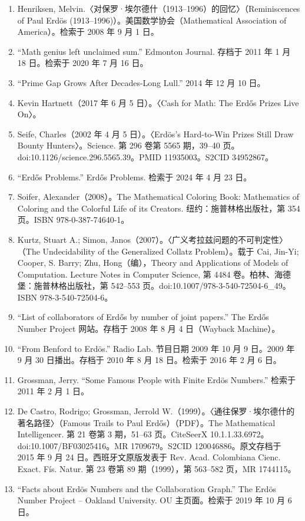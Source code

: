 \begin{enumerate}
\item Henriksen, Melvin.〈对保罗·埃尔德什（1913–1996）的回忆〉（Reminiscences of Paul Erdös (1913–1996)）。美国数学协会（Mathematical Association of America）。检索于 2008 年 9 月 1 日。
\item “Math genius left unclaimed sum.” Edmonton Journal. 存档于 2011 年 1 月 18 日。检索于 2020 年 7 月 16 日。
\item “Prime Gap Grows After Decades-Long Lull.” 2014 年 12 月 10 日。
\item Kevin Hartnett（2017 年 6 月 5 日）。〈Cash for Math: The Erdős Prizes Live On〉。
\item Seife, Charles（2002 年 4 月 5 日）。〈Erdös’s Hard-to-Win Prizes Still Draw Bounty Hunters〉。Science. 第 296 卷第 5565 期，39–40 页。doi:10.1126/science.296.5565.39。PMID 11935003。S2CID 34952867。
\item “Erdős Problems.” Erdős Problems. 检索于 2024 年 4 月 23 日。
\item Soifer, Alexander（2008）。The Mathematical Coloring Book: Mathematics of Coloring and the Colorful Life of its Creators. 纽约：施普林格出版社，第 354 页。ISBN 978-0-387-74640-1。
\item Kurtz, Stuart A.; Simon, Janos（2007）。〈广义考拉兹问题的不可判定性〉（The Undecidability of the Generalized Collatz Problem）。载于 Cai, Jin-Yi; Cooper, S. Barry; Zhu, Hong（编），Theory and Applications of Models of Computation. Lecture Notes in Computer Science, 第 4484 卷。柏林、海德堡：施普林格出版社，第 542–553 页。doi:10.1007/978-3-540-72504-6_49。ISBN 978-3-540-72504-6。
\item “List of collaborators of Erdős by number of joint papers.” The Erdős Number Project 网站。存档于 2008 年 8 月 4 日（Wayback Machine）。
\item “From Benford to Erdös.” Radio Lab. 节目日期 2009 年 10 月 9 日。2009 年 9 月 30 日播出。存档于 2010 年 8 月 18 日。检索于 2016 年 2 月 6 日。
\item Grossman, Jerry. “Some Famous People with Finite Erdös Numbers.” 检索于 2011 年 2 月 1 日。
\item De Castro, Rodrigo; Grossman, Jerrold W.（1999）。〈通往保罗·埃尔德什的著名路径〉（Famous Trails to Paul Erdős）（PDF）。The Mathematical Intelligencer. 第 21 卷第 3 期，51–63 页。CiteSeerX 10.1.1.33.6972。doi:10.1007/BF03025416。MR 1709679。S2CID 120046886。原文存档于 2015 年 9 月 24 日。西班牙文原版发表于 Rev. Acad. Colombiana Cienc. Exact. Fís. Natur. 第 23 卷第 89 期（1999），第 563–582 页，MR 1744115。
\item “Facts about Erdös Numbers and the Collaboration Graph.” The Erdös Number Project – Oakland University. OU 主页面。检索于 2019 年 10 月 6 日。

\end{enumerate}